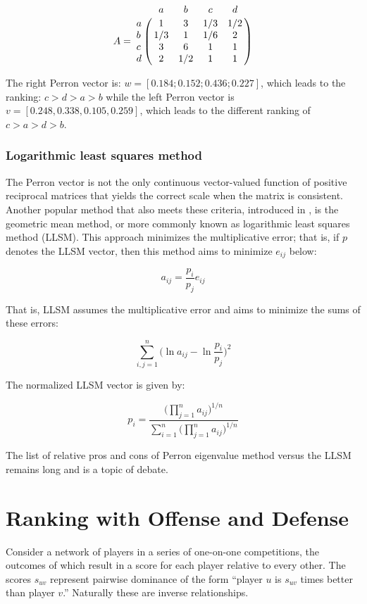 \documentclass[a4,11pt,twoside,leqno]{report}
\theoremstyle{definition}
\theoremstyle{remark}
\numberwithin{equation}{section}
\begin{document}
$$A=\bordermatrix{\ & a & b & c & d \cr a & 1 & 3 & 1/3 & 1/2  \cr b & 1/3 & 1 & 1/6 & 2 \cr c & 3 & 6 & 1 &1\cr d & 2 & 1/2 & 1 & 1}$$

\vspace{5mm}

The right Perron vector is: $w=[0.184; 0.152; 0.436; 0.227]$, which leads to the ranking: $c>d >a >b$ while the left Perron vector is $v=[0.248, 0.338, 0.105, 0.259]$, which leads to the different ranking of $c>a>d>b$.

\subsection{Logarithmic least squares method}

The Perron vector is not the only continuous vector-valued function of positive reciprocal matrices that yields the correct scale when the matrix is consistent. Another popular method that also meets these criteria, introduced in \cite{crawford}, is the geometric mean method, or more commonly known as logarithmic least squares method (LLSM). This approach minimizes the multiplicative error; that is, if $p$ denotes the LLSM vector, then this method aims to minimize $e_{ij}$ below:

$$a_{ij}=\frac{p_i}{p_j}e_{ij}$$

That is, LLSM assumes the multiplicative error and aims to minimize the sums of these errors:

$$\displaystyle \sum_{i,j=1}^n \big(\ln{a_{ij}}-\ln{\frac{p_i}{p_j}}\big)^2$$


The normalized LLSM vector is given by:

$$p_i= \frac{\displaystyle\Big(\prod_{j=1}^n a_{ij}\Big)^{1/n}}{\displaystyle \sum_{i=1}^{n}\Big(\prod_{j=1}^n a_{ij}\Big)^{1/n}}$$

The list of relative pros and cons of Perron eigenvalue method versus the LLSM remains long and is a topic of debate. 

\chapter{Ranking with Offense and Defense}

Consider a network of players in a series of one-on-one competitions, the
outcomes of which result in a score for each player relative to every other.
The scores $s_{uv}$ represent pairwise dominance of the form ``player $u$ is
$s_{uv}$ times better than player $v$.''  Naturally these are inverse
relationships.
\end{document}
